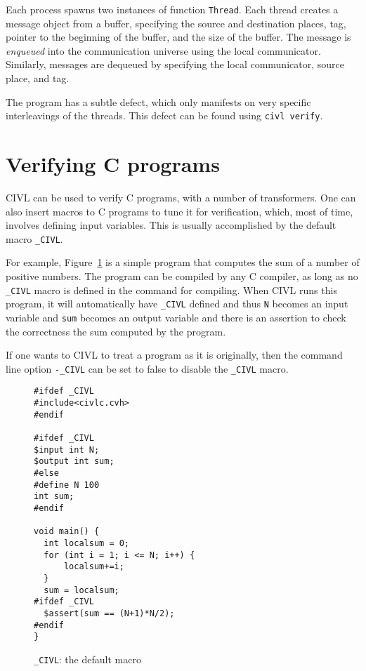 Each process spawns two instances of function \texttt{Thread}.  Each
thread creates a message object from a buffer, specifying the source
and destination places, tag, pointer to the beginning of the buffer,
and the size of the buffer.  The message is \emph{enqueued} into the
communication universe using the local communicator.  Similarly,
messages are dequeued by specifying the local communicator, source
place, and tag.

The program has a subtle defect, which only manifests on very specific
interleavings of the threads.   This defect can be found using
\texttt{civl verify}.

\section{Verifying C programs}
CIVL can be used to verify C programs, with a number of transformers. One can also insert macros to C programs to tune it for verification, which, most of time, involves defining input variables. This is usually accomplished by the default macro \texttt{\_CIVL}.

For example, Figure~\ref{fig:CIVLmacro} is a simple program that computes the sum of a number of positive numbers. The program can be compiled by any C compiler, as long as no \texttt{\_CIVL} macro is defined in the command for compiling. When CIVL runs this program, it will automatically have \texttt{\_CIVL} defined and thus \texttt{N} becomes an input variable and \texttt{sum} becomes an output variable and there is an assertion to check the correctness the sum computed by the program. 

If one wants to CIVL to treat a program as it is originally, then the command line option \texttt{-\_CIVL} can be set to false to disable the \texttt{\_CIVL} macro.

\begin{figure}[H]
\begin{small}
\begin{verbatim}
#ifdef _CIVL
#include<civlc.cvh>
#endif

#ifdef _CIVL
$input int N;
$output int sum;
#else
#define N 100
int sum;
#endif

void main() {
  int localsum = 0;
  for (int i = 1; i <= N; i++) {
	  localsum+=i;
  } 
  sum = localsum;
#ifdef _CIVL
  $assert(sum == (N+1)*N/2);
#endif
}

\end{verbatim}
  \end{small}
  \caption{\texttt{\_CIVL}: the default macro}
  \label{fig:CIVLmacro}
\end{figure}



